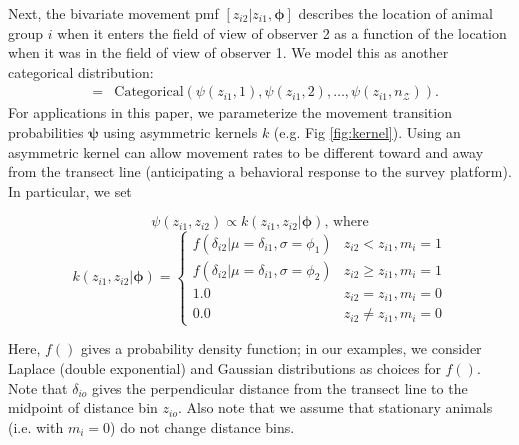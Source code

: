 \documentclass[12pt,fleqn]{article}
\begin{document}
Next, the bivariate movement pmf $[z_{i2}|z_{i1},\boldsymbol{\phi}]$ describes the location of animal group $i$ when it enters the field of view of observer 2 as a function of the location when it was in the field of view of observer 1.  We model this as another categorical distribution:
\begin{eqnarray}
  [z_{i2}|z_{i1},\boldsymbol{\phi}] & = & \text{Categorical} \left( \psi(z_{i1},1),\psi(z_{i1},2),\hdots,\psi(z_{i1},n_\mathcal{Z}) \right).
  \label{eqn:move}
\end{eqnarray}
For applications in this paper, we parameterize the movement transition probabilities $\boldsymbol{\psi}$ using asymmetric kernels $k$ (e.g. Fig \ref{fig:kernel}).  Using an asymmetric kernel can allow movement rates to be different toward and away from the transect line (anticipating a behavioral response to the survey platform). In particular, we set
\begin{linenomath*}
\begin{equation}
  \psi(z_{i1},z_{i2}) \propto k(z_{i1},z_{i2}|\boldsymbol{\phi}) \text{, where}
  \label{eq:psi}
\end{equation}
\begin{equation}
  k(z_{i1},z_{i2}|\boldsymbol{\phi}) = \left\{ \begin{array}{rl}
                                    f(\delta_{i2}|\mu=\delta_{i1},\sigma=\phi_1) & z_{i2}<z_{i1}, m_i = 1 \\
                                    f(\delta_{i2}|\mu=\delta_{i1},\sigma=\phi_2) & z_{i2} \ge z_{i1}, m_i = 1  \\
                                    1.0 & z_{i2}=z_{i1}, m_i=0 \\
                                    0.0 & z_{i2} \ne z_{i1}, m_i=0
                                    \end{array} \right.
  \label{eq:g}
\end{equation}
\end{linenomath*}
Here, $f()$ gives a probability density function; in our examples, we consider Laplace (double exponential) and Gaussian distributions as choices for $f()$. Note that $\delta_{io}$ gives the perpendicular distance from the transect line to the midpoint of distance bin $z_{io}$.  Also note that we assume that stationary animals (i.e. with $m_i=0$) do not change distance bins.
\end{document}
